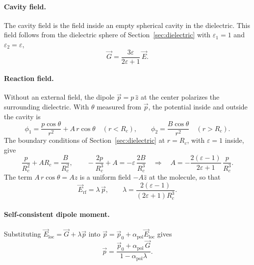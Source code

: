 \paragraph{Cavity field.}
The cavity field is the field inside an empty spherical cavity in the dielectric. This field follows from the dielectric sphere of Section~\ref{sec:dielectric} with $\varepsilon_1 = 1$ and $\varepsilon_2 = \varepsilon$,
\begin{equation*}
    \vec G = \frac{3\varepsilon}{2\varepsilon + 1}\,\vec E.
\end{equation*}

\paragraph{Reaction field.}
Without an external field, the dipole $\vec p = p\,\hat z$ at the center polarizes the surrounding dielectric. With $\theta$ measured from $\vec p$, the potential inside and outside the cavity is
\begin{equation*}
    \phi_1 = \frac{p\cos\theta}{r^2} + A\,r\cos\theta \quad (r < R_c),
    \qquad
    \phi_2 = \frac{B\cos\theta}{r^2} \quad (r > R_c).
\end{equation*}
The boundary conditions of Section~\ref{sec:dielectric} at $r = R_c$, with $\varepsilon = 1$ inside, give
\begin{equation*}
    \frac{p}{R_c^2} + A R_c = \frac{B}{R_c^2},
    \qquad
    -\frac{2p}{R_c^3} + A = -\varepsilon\,\frac{2B}{R_c^3}
    \quad\Rightarrow\quad
    A = -\frac{2(\varepsilon - 1)}{2\varepsilon + 1}\,\frac{p}{R_c^3}.
\end{equation*}
The term $A\,r\cos\theta = A z$ is a uniform field $-A\hat z$ at the molecule, so that
\begin{equation*}
    \vec E_{\text{rf}} = \lambda\,\vec p,
    \qquad
    \lambda = \frac{2(\varepsilon - 1)}{(2\varepsilon + 1)R_c^3}.
\end{equation*}

\paragraph{Self-consistent dipole moment.}
Substituting $\vec E_{\text{loc}} = \vec G + \lambda\vec p$ into $\vec p = \vec p_0 + \alpha_{\text{pol}}\vec E_{\text{loc}}$ gives
\begin{equation*}
    \vec p = \frac{\vec p_0 + \alpha_{\text{pol}}\,\vec G}{1 - \alpha_{\text{pol}}\lambda}.
\end{equation*}

